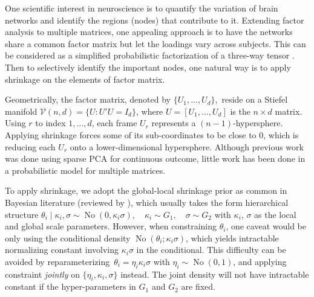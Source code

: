\documentclass[10pt,fleqn]{article}
\newcommand{\mc}[1]{\mathcal{#1}}
\DeclareMathOperator{\No}{No}
\DeclareMathOperator{\1}{\mathbbm{1}}
\begin{document}
One scientific interest in neuroscience is to quantify the variation of brain networks and identify the  regions
(nodes) that contribute to it. Extending 
factor analysis to multiple matrices, one appealing approach
is to have the networks share a common factor matrix but let the  loadings
vary across subjects. This
can be considered as a simplified probabilistic factorization of a three-way
tensor \citep{kolda2009tensor}. Then to selectively identify the important nodes, one natural way is to apply shrinkage on the elements
of factor matrix.


Geometrically, the factor matrix, denoted by $\{U_1,\ldots,U_d\},$ reside on a Stiefel manifold $\mc V(n,d)=\{U: U'U=I_d\}$, where $U=[U_1,\ldots,U_d]$ is the $n\times d$ matrix. Using $r$ to index $1,\ldots,d$, each frame $U_r$ represents a $(n-1)$-hypersphere. Applying shrinkage forces some of its sub-coordinates to be close to $0$, which
is  reducing each $U_r$ onto a lower-dimensional hypersphere.
Although previous work was done using sparse PCA \citep{zou2006sparse} for
continuous outcome,  little work has been done in a probabilistic model for
multiple matrices.

To apply shrinkage, we adopt the global-local shrinkage prior  as common in Bayesian  literature (reviewed by
\cite{polson2012local}), which usually takes the form hierarchical structure $\theta_i\mid
\kappa_i  ,\sigma\sim \No(0,\kappa_i \sigma), \quad \kappa_i\sim G_1, \quad \sigma \sim G_2$ with
$\kappa_i$, $\sigma$ as the local and global scale parameters.  However,
when constraining $\theta_i$, one caveat would be only using the conditional density $\No(\theta_i;\kappa_i \sigma)$, which  yields intractable normalizing constant involving $\kappa_i \sigma$ in the conditional. This difficulty can be avoided by
reparameterizing\ $\theta_i=\eta_i\kappa_i\sigma$ with $\eta_i\sim\No(0,1)$, and applying constraint {\it jointly} on $\{\eta_i,\kappa_i,\sigma\}$ instead. The
joint density will not have intractable constant if the hyper-parameters in $G_1$ and $G_2$ are fixed.
\end{document}
